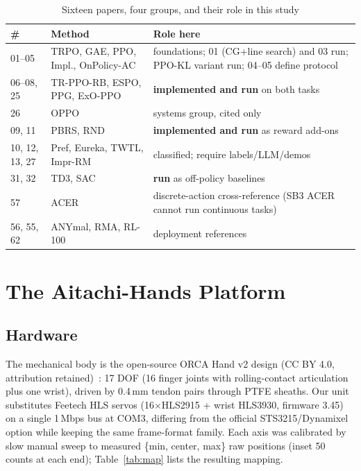 \documentclass[conference]{IEEEtran}
\begin{document}
\begin{table}[!t]
\caption{Sixteen papers, four groups, and their role in this study}
\label{tab:groups}
\centering
\small
\begin{tabular}{@{}p{0.5cm}p{2.5cm}p{4.6cm}@{}}
\toprule
\# & Method & Role here \\
\midrule
01--05 & TRPO, GAE, PPO, Impl., OnPolicy-AC & foundations; 01 (CG+line search) and 03 run; PPO-KL variant run; 04--05 define protocol \\
06--08, 25 & TR-PPO-RB, ESPO, PPG, ExO-PPO & \textbf{implemented and run} on both tasks \\
26 & OPPO & systems group, cited only \\
09, 11 & PBRS, RND & \textbf{implemented and run} as reward add-ons \\
10, 12, 13, 27 & Pref, Eureka, TWTL, Impr-RM & classified; require labels/LLM/demos \\
31, 32 & TD3, SAC & \textbf{run} as off-policy baselines \\
57 & ACER & discrete-action cross-reference (SB3 ACER cannot run continuous tasks) \\
56, 55, 62 & ANYmal, RMA, RL-100 & deployment references \\
\bottomrule
\end{tabular}
\end{table}

\section{The Aitachi-Hands Platform}\label{sec:platform}
\subsection{Hardware}
The mechanical body is the open-source ORCA Hand v2 design (CC BY 4.0, attribution retained)~\cite{orca}: 17 DOF (16 finger joints
with rolling-contact articulation plus one wrist), driven by 0.4\,mm
tendon pairs through PTFE sheaths. Our unit substitutes Feetech HLS servos
(16$\times$HLS2915 + wrist HLS3930, firmware 3.45) on a single 1\,Mbps bus at
COM3, differing from the official STS3215/Dynamixel option while keeping the
same frame-format family. Each axis was calibrated by slow manual sweep to
measured \{min, center, max\} raw positions (inset 50 counts at each end);
Table~\ref{tab:map} lists the resulting mapping.
\end{document}
